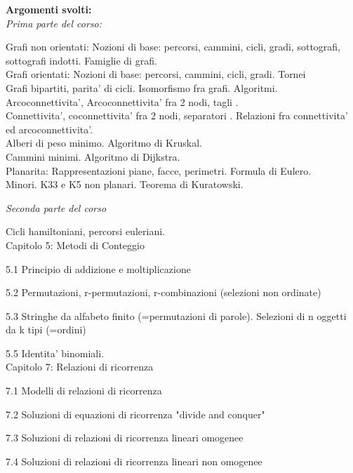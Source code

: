 \documentclass[12pt,a4paper]{article}
\begin{document}
















\begin{center}
\textbf{Argomenti svolti:} \\

\textit{Prima parte del corso:}
\begin{center}
Grafi non orientati: Nozioni di base: percorsi, cammini, cicli, gradi, sottografi, sottografi indotti. Famiglie di grafi. \\
Grafi orientati: Nozioni di base: percorsi, cammini, cicli, gradi. Tornei \\
Grafi bipartiti, parita' di cicli. Isomorfismo fra grafi. Algoritmi. \\
Arcoconnettivita', Arcoconnettivita' fra 2 nodi, tagli .\\
Connettivita', coconnettivita' fra 2 nodi, separatori . Relazioni fra connettivita' ed arcoconnettivita'. \\
Alberi di peso minimo. Algoritmo di Kruskal.\\
Cammini minimi. Algoritmo di Dijkstra.\\
Planarita: Rappresentazioni piane, facce, perimetri. Formula di Eulero.\\
Minori. K33 e K5 non planari. Teorema di Kuratowski.
\end{center}

\textit{Seconda parte del corso} 
\begin{center}
Cicli hamiltoniani, percorsi euleriani.\\
Capitolo 5: Metodi di Conteggio\par
5.1 Principio di addizione e moltiplicazione\par
5.2 Permutazioni, r-permutazioni, r-combinazioni (selezioni non ordinate)\par
5.3 Stringhe da alfabeto finito (=permutazioni di parole). Selezioni di n oggetti da k tipi (=ordini)\par
5.5 Identita' binomiali.\\
Capitolo 7: Relazioni di ricorrenza\par
7.1 Modelli di relazioni di ricorrenza\par
7.2 Soluzioni di equazioni di ricorrenza "divide and conquer"\par
7.3 Soluzioni di relazioni di ricorrenza lineari omogenee\par
7.4 Soluzioni di relazioni di ricorrenza lineari non omogenee
\end{center}
\end{center}
\end{document}
